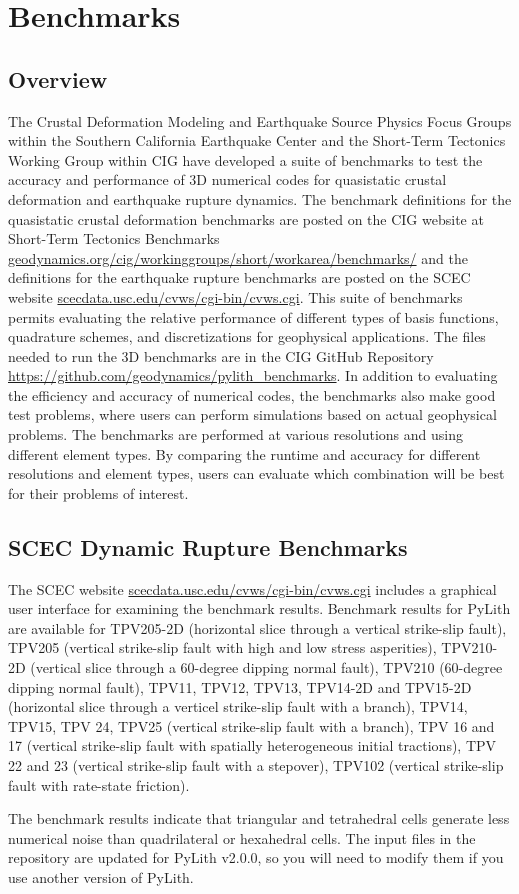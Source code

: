 \chapter{Benchmarks}
\label{sec:benchmarks}


\section{Overview}

The Crustal Deformation Modeling and Earthquake Source Physics Focus
Groups within the Southern California Earthquake Center and the Short-Term
Tectonics Working Group within CIG have developed a suite of benchmarks
to test the accuracy and performance of 3D numerical codes for quasistatic
crustal deformation and earthquake rupture dynamics. The benchmark
definitions for the quasistatic crustal deformation benchmarks are
posted on the CIG website at Short-Term Tectonics Benchmarks \url{geodynamics.org/cig/workinggroups/short/workarea/benchmarks/}
and the definitions for the earthquake rupture benchmarks are posted
on the SCEC website \url{scecdata.usc.edu/cvws/cgi-bin/cvws.cgi}.
This suite of benchmarks permits evaluating the relative performance
of different types of basis functions, quadrature schemes, and discretizations
for geophysical applications. The files needed to run the 3D benchmarks
are in the CIG GitHub Repository \url{https://github.com/geodynamics/pylith_benchmarks}.
In addition to evaluating the efficiency and accuracy of numerical
codes, the benchmarks also make good test problems, where users can
perform simulations based on actual geophysical problems. The benchmarks
are performed at various resolutions and using different element types.
By comparing the runtime and accuracy for different resolutions and
element types, users can evaluate which combination will be best for
their problems of interest.





\section{SCEC Dynamic Rupture Benchmarks}
\label{sec:scec:dynamic:rupture:benchmarks}

The SCEC website \url{scecdata.usc.edu/cvws/cgi-bin/cvws.cgi} includes
a graphical user interface for examining the benchmark results. Benchmark
results for PyLith are available for TPV205-2D (horizontal slice through
a vertical strike-slip fault), TPV205 (vertical strike-slip fault
with high and low stress asperities), TPV210-2D (vertical slice through
a 60-degree dipping normal fault), TPV210 (60-degree dipping normal
fault), TPV11, TPV12, TPV13, TPV14-2D and TPV15-2D (horizontal slice
through a verticel strike-slip fault with a branch), TPV14, TPV15,
TPV 24, TPV25 (vertical strike-slip fault with a branch), TPV 16 and
17 (vertical strike-slip fault with spatially heterogeneous initial
tractions), TPV 22 and 23 (vertical strike-slip fault with a stepover),
TPV102 (vertical strike-slip fault with rate-state friction).

The benchmark results indicate that triangular and tetrahedral cells
generate less numerical noise than quadrilateral or hexahedral cells.
The input files in the repository are updated for PyLith v2.0.0, so
you will need to modify them if you use another version of PyLith.
